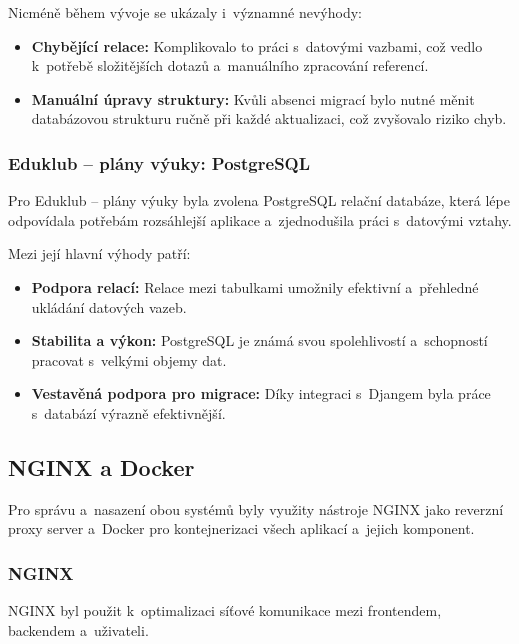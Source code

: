 \documentclass[male,czech,api_bc]{kitheses}
\begin{document}
Nicméně během vývoje se ukázaly i~významné nevýhody:
\begin{itemize}
	\item \textbf{Chybějící relace:} Komplikovalo to práci s~datovými vazbami, což vedlo k~potřebě složitějších dotazů a~manuálního zpracování referencí.
	\item \textbf{Manuální úpravy struktury:} Kvůli absenci migrací bylo nutné měnit databázovou strukturu ručně při každé aktualizaci, což zvyšovalo riziko chyb.
\end{itemize}

\subsubsection{Eduklub – plány výuky: PostgreSQL}

Pro Eduklub – plány výuky byla zvolena PostgreSQL relační databáze, která lépe odpovídala potřebám rozsáhlejší aplikace a~zjednodušila práci s~datovými vztahy.

Mezi její hlavní výhody patří:
\begin{itemize}
	\item \textbf{Podpora relací:} Relace mezi tabulkami umožnily efektivní a~přehledné ukládání datových vazeb.
	\item \textbf{Stabilita a výkon:} PostgreSQL je známá svou spolehlivostí a~schopností pracovat s~velkými objemy dat.
	\item \textbf{Vestavěná podpora pro migrace:} Díky integraci s~Djangem byla práce s~databází výrazně efektivnější.
\end{itemize}

\subsection{NGINX a Docker}

Pro správu a~nasazení obou systémů byly využity nástroje NGINX jako reverzní proxy server a~Docker pro kontejnerizaci všech aplikací a~jejich komponent.

\subsubsection{NGINX}

NGINX byl použit k~optimalizaci síťové komunikace mezi frontendem, backendem a~uživateli.
\end{document}
